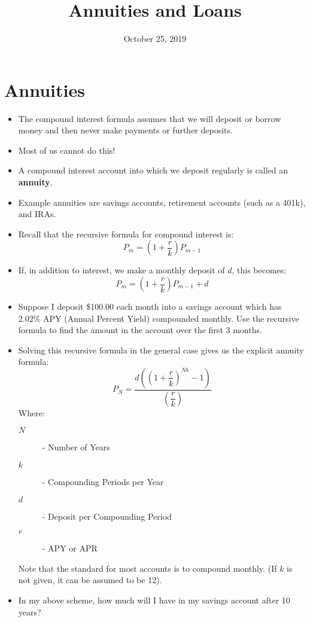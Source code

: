 \documentclass{article}
\title{Annuities and Loans}
\date{October 25, 2019}
\begin{document}
\maketitle

\section{Annuities}
\begin{itemize}
    \item The compound interest formula assumes that we will deposit
        or borrow money and then never make payments or further deposits.
    \item Most of us cannot do this!
    \item A compound interest account into which we deposit regularly
        is called an \textbf{annuity}.
    \item Example annuities are savings accounts, retirement accounts
        (such as a 401k), and IRAs.
    \item Recall that the recursive formula for compound interest is:
        \[
            P_m = \left(1+\dfrac{r}{k}\right) P_{m-1}
        \]
    \item If, in addition to interest, we make a monthly deposit of
        $d$, this becomes:
        \[
            P_m = \left(1+\dfrac{r}{k}\right) P_{m-1} + d
        \]
    \item Suppose I deposit \$100.00 each month into a savings account
        which has 2.02\% APY (Annual Percent Yield) compounded
        monthly.  Use the recursive formula to find the amount in the
        account over the first 3 months.
    \item Solving this recursive formula in the general case gives us
        the explicit annuity formula:
        \[
            P_N = \dfrac{d\left(\left(1+\dfrac{r}{k}\right)^{Nk} - 1 \right)}%
                        {\left(\dfrac{r}{k}\right)}
        \]
        Where:
        \begin{description}
            \item[$N$] - Number of Years
            \item[$k$] - Compounding Periods per Year
            \item[$d$] - Deposit per Compounding Period
            \item[$r$] - APY or APR
        \end{description}
        Note that the standard for most accounts is to compound
        monthly.  (If $k$ is not given, it can be assumed to be 12).

    \item In my above scheme, how much will I have in my savings
        account after 10 years?
\end{itemize}
\end{document}
